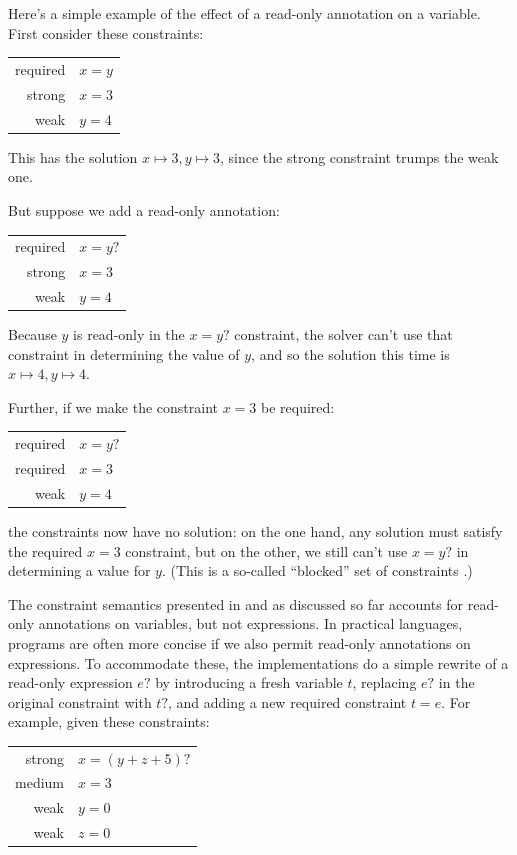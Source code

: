 \documentclass{article}
\begin{document}
Here's a simple example of the effect of a read-only annotation on a
variable.  First consider these constraints:

\begin{tabular}{rl}
required & $x=y$ \\
strong   & $x=3$ \\
weak     & $y=4$
\end{tabular}

This has the solution $x \mapsto 3, y \mapsto 3$, since the strong
constraint trumps the weak one.  

But suppose we add a read-only annotation:

\begin{tabular}{rl}
required & $x=y?$ \\
strong   & $x=3$ \\
weak     & $y=4$
\end{tabular}

Because $y$ is read-only in the $x=y?$ constraint, the solver can't
use that constraint in determining the value of $y$, and so the
solution this time is $x \mapsto 4, y \mapsto 4$.

Further, if we make the constraint $x=3$ be required:

\begin{tabular}{rl}
required & $x=y?$ \\
required & $x=3$ \\
weak     & $y=4$
\end{tabular}

the constraints now have no solution: on the one hand, any solution
must satisfy the required $x=3$ constraint, but on the other, we still
can't use $x=y?$ in determining a value for $y$.  (This is a so-called
``blocked'' set of constraints
\cite{borning-lisp-symbolic-computation-1992}.)

The constraint semantics presented in
\cite{borning-lisp-symbolic-computation-1992} and as discussed so far
accounts for read-only annotations on variables, but not expressions.
In practical languages, programs are often more concise if we also
permit read-only annotations on expressions.  To accommodate these,
the implementations do a simple rewrite of a read-only expression $e?$
by introducing a fresh variable $t$, replacing $e?$ in the original
constraint with $t?$, and adding a new required constraint $t=e$\@.
For example, given these constraints:

\begin{tabular}{rl}
strong   & $x=(y+z+5)?$ \\
medium   & $x=3$ \\
weak     & $y=0$ \\
weak     & $z=0$
\end{tabular}
\end{document}
